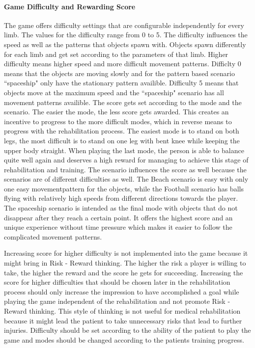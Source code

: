 \paragraph{Game Difficulty and Rewarding Score}
The game offers difficulty settings that are configurable independently for every limb. The values for the difficulty range from 0 to 5. The difficulty influences the speed as well as the patterns that objects spawn with. Objects spawn differently for each limb and get set according to the parameters of that limb. Higher difficulty means higher speed and more difficult movement patterns.
Difficlty 0 means that the objects are moving slowly and for the pattern based scenario ``spaceship" only have the stationary pattern availible. Difficulty 5 means that objects move at the maximum speed and the ``spaceship" scenario has all movement patterns availible.
The score gets set according to the mode and the scenario. The easier the mode, the less score gets awarded. This creates an incentive to progress to the more difficult modes, which in reverse means to progress with the rehabilitation process. The easiest mode is to stand on both legs, the most difficult is to stand on one leg with bent knee while keeping the upper body straight. When playing the last mode, the person is able to balance quite well again and deserves a high reward for managing to achieve this stage of rehabilitation and training. The scenario influences the score as well because the scenarios are of different difficulties as well. The Beach scenario is easy with only one easy movementpattern for the objects, while the Football scenario has balls flying with relatively high speeds from different directions towards the player. The spaceship scenario is intended as the final mode with objects that do not disappear after they reach a certain point. It offers the highest score and an unique experience without time pressure which makes it easier to follow the complicated movement patterns.

Increasing score for higher difficulty is not implemented into the game because it might bring in Risk - Reward thinking. The higher the risk a player is willing to take, the higher the reward and the score he gets for succeeding. Increasing the score for higher difficulties that should be chosen later in the rehabilitation process should only increase the impression to have accomplished a goal while playing the game independent of the rehabilitation and not promote Risk - Reward thinking. This style of thinking is not useful for medical rehabilitation because it might lead the patient to take unnecessary risks that lead to further injuries. Difficulty should be set according to the ability of the patient to play the game and modes should be changed according to the patients training progress.